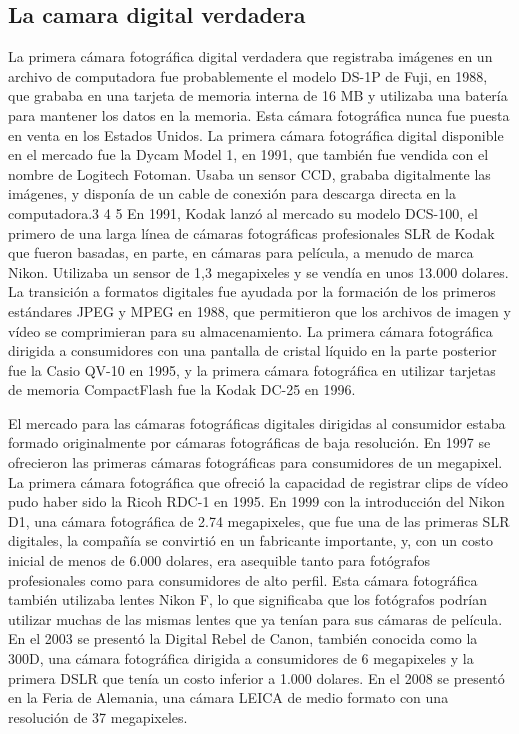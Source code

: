 \documentclass[12pt,a4paper]{report}
\begin{document}
\subsection{La camara digital verdadera}
La primera cámara fotográfica digital verdadera que registraba imágenes en un archivo de computadora fue probablemente el modelo DS-1P de Fuji, en 1988, que grababa en una tarjeta de memoria interna de 16 MB y utilizaba una batería para mantener los datos en la memoria. Esta cámara fotográfica nunca fue puesta en venta en los Estados Unidos. La primera cámara fotográfica digital disponible en el mercado fue la Dycam Model 1, en 1991, que también fue vendida con el nombre de Logitech Fotoman. Usaba un sensor CCD, grababa digitalmente las imágenes, y disponía de un cable de conexión para descarga directa en la computadora.3 4 5
En 1991, Kodak lanzó al mercado su modelo DCS-100, el primero de una larga línea de cámaras fotográficas profesionales SLR de Kodak que fueron basadas, en parte, en cámaras para película, a menudo de marca Nikon. Utilizaba un sensor de 1,3 megapixeles y se vendía en unos 13.000 dolares.
La transición a formatos digitales fue ayudada por la formación de los primeros estándares JPEG y MPEG en 1988, que permitieron que los archivos de imagen y vídeo se comprimieran para su almacenamiento. La primera cámara fotográfica dirigida a consumidores con una pantalla de cristal líquido en la parte posterior fue la Casio QV-10 en 1995, y la primera cámara fotográfica en utilizar tarjetas de memoria CompactFlash fue la Kodak DC-25 en 1996.

El mercado para las cámaras fotográficas digitales dirigidas al consumidor estaba formado originalmente por cámaras fotográficas de baja resolución. En 1997 se ofrecieron las primeras cámaras fotográficas para consumidores de un megapixel. La primera cámara fotográfica que ofreció la capacidad de registrar clips de vídeo pudo haber sido la Ricoh RDC-1 en 1995.
En 1999 con la introducción del Nikon D1, una cámara fotográfica de 2.74 megapixeles, que fue una de las primeras SLR digitales, la compañía se convirtió en un fabricante importante, y, con un costo inicial de menos de 6.000 dolares, era asequible tanto para fotógrafos profesionales como para consumidores de alto perfil. Esta cámara fotográfica también utilizaba lentes Nikon F, lo que significaba que los fotógrafos podrían utilizar muchas de las mismas lentes que ya tenían para sus cámaras de película.
En el 2003 se presentó la Digital Rebel de Canon, también conocida como la 300D, una cámara fotográfica dirigida a consumidores de 6 megapixeles y la primera DSLR que tenía un costo inferior a 1.000 dolares.
En el 2008 se presentó en la Feria de Alemania, una cámara LEICA de medio formato con una resolución de 37 megapixeles.
\end{document}
